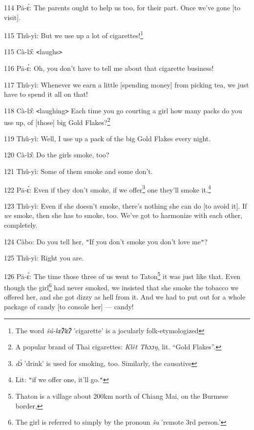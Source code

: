 114 Pā-ɛ́: The parents ought to help us too, for their part. Once we've gone
[to visit].

115 Thû-yì: But we use up a lot of cigarettes!\footnote{The word \textit{šú-kɛ̂ʔlɛ̂ʔ} 'cigarette' is a jocularly folk-etymologized}

115 Cà-lɔ̂: \texttt{<}laughs\texttt{>}

116 Pā-ɛ́: Oh, you don't have to tell me about that cigarette business!

117 Thû-yì: Whenever we earn a little [spending money] from picking tea, we just
have to spend it all on that!

118 Cà-lɔ̂: \texttt{<}laughing\texttt{>} Each time you go courting a girl how
many packs do you use up, of [those] big Gold Flakes?\footnote{A popular brand of Thai cigarettes: \textit{Klèt Thɔɔŋ}, lit. ``Gold Flakes''.}

119 Thû-yì: Well, I use up a pack of the big Gold Flakes every night.

120 Cà-lɔ̂: Do the girls smoke, too?

121 Thû-yì: Some of them smoke and some don't.

122 Pā-ɛ́: Even if they don't smoke, if we offer\footnote{\textit{dɔ̀} 'drink' is used for smoking, too. Similarly, the causative} one they'll smoke it.\footnote{Lit: \texttt{"}if we offer one, it'll go.\texttt{"}}

123 Thû-yì: Even if she doesn't smoke, there's nothing she can do [to avoid it].
If \textit{we} smoke, then she has to smoke, too. We've got to harmonize with each
other, completely.

124 Càbo: Do you tell her, \texttt{"}If you don't smoke you don't love me\texttt{"}?

125 Thû-yì: Right you are.

126 Pā-ɛ́: The time those three of us went to Taton\footnote{Thaton is a village about 200km north of Chiang Mai, on the Burmese border,} it was just like that.
Even though the girl\footnote{The girl is referred to simply by the pronoun \textit{šu} 'remote 3rd person.'} had never smoked, we insisted that she smoke the tobacco
we offered her, and she got dizzy as hell from it. And we had to put out for a
whole package of candy [to console her] --- candy!

